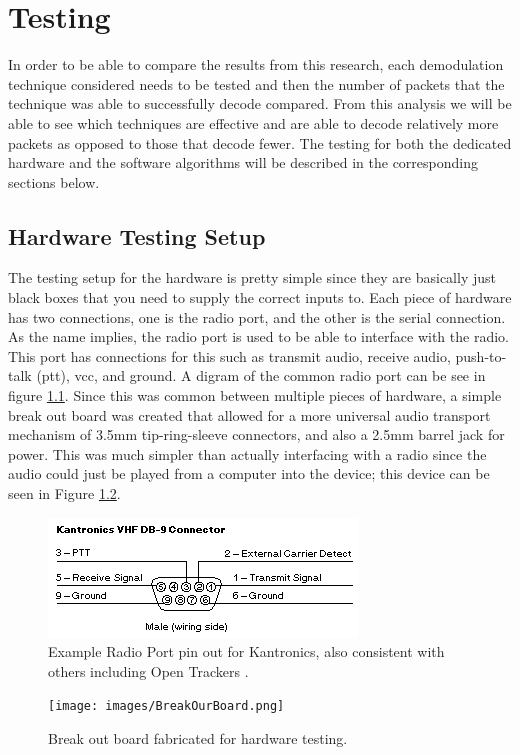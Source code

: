\chapter{Testing}
In order to be able to compare the results from this research, each demodulation technique considered needs to be tested and then the number of packets that the technique was able to successfully decode compared. From this analysis we will be able to see which techniques are effective and are able to decode relatively more packets as opposed to those that decode fewer. The testing for both the dedicated hardware and the software algorithms will be described in the corresponding sections below.

\section{Hardware Testing Setup}
The testing setup for the hardware is pretty simple since they are basically just black boxes that you need to supply the correct inputs to. Each piece of hardware has two connections, one is the radio port, and the other is the serial connection. As the name implies, the radio port is used to be able to interface with the radio. This port has connections for this such as transmit audio, receive audio, push-to-talk (ptt), vcc, and ground. A digram of the common radio port can be see in figure \ref{RadioPortPinout}. Since this was common between multiple pieces of hardware, a simple break out board was created that allowed for a more universal audio transport mechanism of 3.5mm tip-ring-sleeve connectors, and also a 2.5mm barrel jack for power. This was much simpler than actually interfacing with a radio since the audio could just be played from a computer into the device; this device can be seen in Figure \ref{BreakOutBoard}. 

\begin{figure}
  \centering
	\includegraphics[width=0.75\linewidth]{images/RadioPortPinout.png} 
	\caption{Example Radio Port pin out for Kantronics, also consistent with others including Open Trackers \cite{Martin2014}.}
   \label{RadioPortPinout}
\end{figure}
\begin{figure}
  \centering
	\texttt{[image: images/BreakOurBoard.png]} 
	\caption{Break out board fabricated for hardware testing.}
   \label{BreakOutBoard}
\end{figure}

